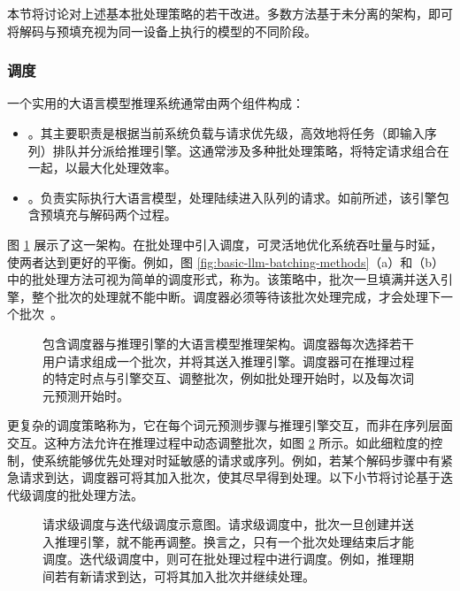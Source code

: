本节将讨论对上述基本批处理策略的若干改进。多数方法基于未分离的架构，即可将解码与预填充视为同一设备上执行的模型的不同阶段。

\subsubsection{调度}

一个实用的大语言模型推理系统通常由两个组件构成：

\begin{itemize}
\item \vspace{0.5cm} 。其主要职责是根据当前系统负载与请求优先级，高效地将任务（即输入序列）排队并分派给推理引擎。这通常涉及多种批处理策略，将特定请求组合在一起，以最大化处理效率。
\item \vspace{0.3cm} 。负责实际执行大语言模型，处理陆续进入队列的请求。如前所述，该引擎包含预填充与解码两个过程。
\end{itemize}
\vspace{0.5em}

图 \ref{fig:llm-inference-scheduler-and-engine} 展示了这一架构。在批处理中引入调度，可灵活地优化系统吞吐量与时延，使两者达到更好的平衡。例如，图 \ref{fig:basic-llm-batching-methods}（a）和（b）中的批处理方法可视为简单的调度形式，称为。该策略中，批次一旦填满并送入引擎，整个批次的处理就不能中断。调度器必须等待该批次处理完成，才会处理下一个批次~\cite{timonin-etal:2022}。

\begin{figure}[!t]
\centering

\vspace{-0.5cm} \caption{包含调度器与推理引擎的大语言模型推理架构。调度器每次选择若干用户请求组成一个批次，并将其送入推理引擎。调度器可在推理过程的特定时点与引擎交互、调整批次，例如批处理开始时，以及每次词元预测开始时。}
\label{fig:llm-inference-scheduler-and-engine}
\end{figure}

更复杂的调度策略称为，它在每个词元预测步骤与推理引擎交互，而非在序列层面交互。这种方法允许在推理过程中动态调整批次，如图 \ref{fig:llm-inference-and-iteration-level-scheduling} 所示。如此细粒度的控制，使系统能够优先处理对时延敏感的请求或序列。例如，若某个解码步骤中有紧急请求到达，调度器可将其加入批次，使其尽早得到处理。以下小节将讨论基于迭代级调度的批处理方法。

\begin{figure}[!t]
\centering

\vspace{-0.5cm} \caption{请求级调度与迭代级调度示意图。请求级调度中，批次一旦创建并送入推理引擎，就不能再调整。换言之，只有一个批次处理结束后才能调度。迭代级调度中，则可在批处理过程中进行调度。例如，推理期间若有新请求到达，可将其加入批次并继续处理。}
\label{fig:llm-inference-and-iteration-level-scheduling}
\end{figure}

